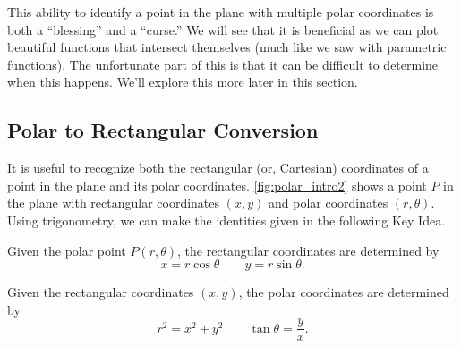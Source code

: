 This ability to identify a point in the plane with multiple polar coordinates is both a ``blessing'' and a ``curse.'' We will see that it is beneficial as we can plot beautiful functions that intersect themselves (much like we saw with parametric functions). The unfortunate part of this is that it can be difficult to determine when this happens. We'll explore this more later in this section.

\subsection*{Polar to Rectangular Conversion}


It is useful to recognize both the rectangular (or, Cartesian) coordinates of a point in the plane and its polar coordinates. \autoref{fig:polar_intro2} shows a point $P$ in the plane with rectangular coordinates $(x,y)$ and polar coordinates $(r,\theta)$. Using trigonometry, we can make the identities given in the following Key Idea.

{Given the polar point $P(r,\theta)$, the rectangular coordinates are determined by $$x=r\cos \theta\qquad y=r\sin \theta.$$

Given the rectangular coordinates $(x,y)$, the polar coordinates are determined by
$$ r^2=x^2+y^2\qquad \tan \theta = \frac yx.$$
}

